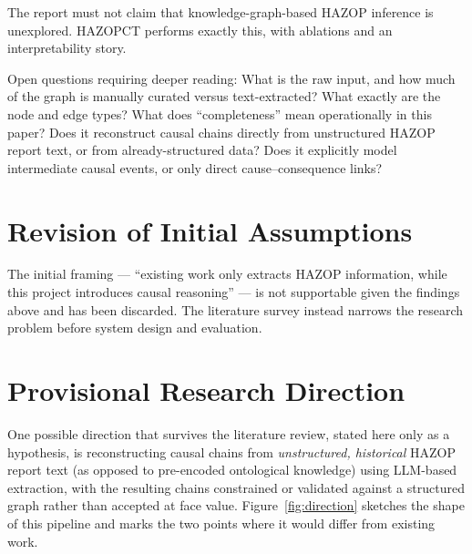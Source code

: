\begin{constraint}
The report must not claim that knowledge-graph-based HAZOP inference is
unexplored. HAZOPCT performs exactly this, with ablations and an
interpretability story.
\end{constraint}

Open questions requiring deeper reading: What is the raw input, and how much of the graph is manually curated versus text-extracted? What exactly are the node and edge types? What does ``completeness'' mean operationally in this paper? Does it reconstruct causal chains directly from unstructured HAZOP report text, or from already-structured data? Does it explicitly model intermediate causal events, or only direct cause--consequence links?

\section{Revision of Initial Assumptions}
The initial framing --- ``existing work only extracts HAZOP information, while this project introduces causal reasoning'' --- is not supportable given the findings above and has been discarded. The literature survey instead narrows the research problem before system design and evaluation.

\section{Provisional Research Direction}
One possible direction that survives the literature review, stated here only as a hypothesis, is reconstructing causal chains from \emph{unstructured, historical} HAZOP report text (as opposed to pre-encoded ontological knowledge) using LLM-based extraction, with the resulting chains constrained or validated against a structured graph rather than accepted at face value. Figure~\ref{fig:direction} sketches the shape of this pipeline and marks the two points where it would differ from existing work.

